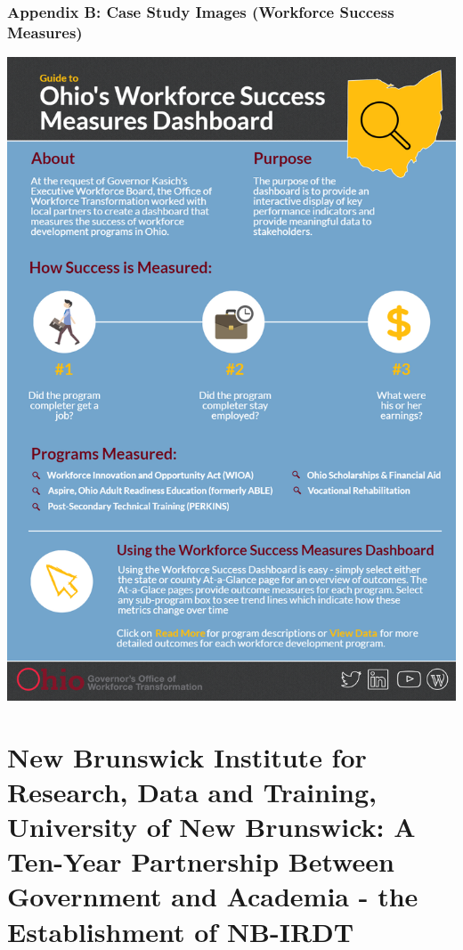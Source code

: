 \documentclass[
]{WileySix}
\begin{document}
\hypertarget{appendix-b-case-study-images-workforce-success-measures}{%
\subsubsection*{Appendix B: Case Study Images (Workforce Success Measures)}\label{appendix-b-case-study-images-workforce-success-measures}}

\includegraphics[width=1\linewidth]{./assets/olda/appendixb}

\hypertarget{nbirdt}{%
\section{New Brunswick Institute for Research, Data and Training, University of New Brunswick: A Ten-Year Partnership Between Government and Academia - the Establishment of NB-IRDT}\label{nbirdt}}
\end{document}
